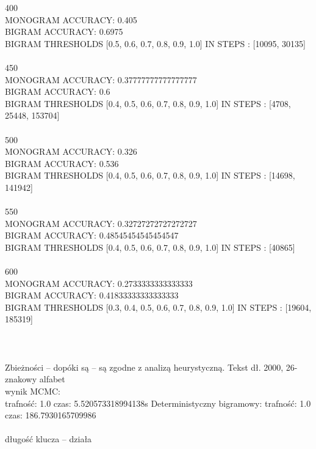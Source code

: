\documentclass[a4paper]{article}
\begin{document}
400\\
MONOGRAM ACCURACY: 0.405\\
BIGRAM ACCURACY: 0.6975\\
BIGRAM THRESHOLDS [0.5, 0.6, 0.7, 0.8, 0.9, 1.0] IN STEPS : [10095, 30135]\\\\
450\\
MONOGRAM ACCURACY: 0.37777777777777777\\
BIGRAM ACCURACY: 0.6\\
BIGRAM THRESHOLDS [0.4, 0.5, 0.6, 0.7, 0.8, 0.9, 1.0] IN STEPS : [4708, 25448, 153704]\\\\
500\\
MONOGRAM ACCURACY: 0.326\\
BIGRAM ACCURACY: 0.536\\
BIGRAM THRESHOLDS [0.4, 0.5, 0.6, 0.7, 0.8, 0.9, 1.0] IN STEPS : [14698, 141942]\\\\
550\\
MONOGRAM ACCURACY: 0.32727272727272727\\
BIGRAM ACCURACY: 0.48545454545454547\\
BIGRAM THRESHOLDS [0.4, 0.5, 0.6, 0.7, 0.8, 0.9, 1.0] IN STEPS : [40865]\\\\
600\\
MONOGRAM ACCURACY: 0.2733333333333333\\
BIGRAM ACCURACY: 0.41833333333333333\\
BIGRAM THRESHOLDS [0.3, 0.4, 0.5, 0.6, 0.7, 0.8, 0.9, 1.0] IN STEPS : [19604, 185319]\\\\
\\\\
Zbieżności – dopóki są – są zgodne z analizą heurystyczną.
Tekst dł. 2000, 26-znakowy alfabet\\
wynik MCMC:\\
trafność: 1.0
czas: 5.520573318994138s
Deterministyczny bigramowy:
trafność: 1.0
czas: 186.7930165709986 \\
\\
długość klucza – działa\\
\end{document}

